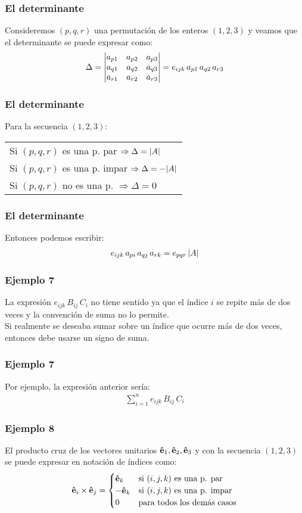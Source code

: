 \documentclass[12pt]{beamer}
\begin{document}
\begin{frame}
\frametitle{El determinante}
Consideremos $(p, q, r)$ una permutación de los enteros $(1, 2, 3)$ y veamos que el determinante se puede expresar como:
\begin{align*}
\Delta = \mqty|
a_{p1} & a_{p2} & a_{p3} \\
a_{q1} & a_{q2} & a_{q3} \\
a_{r1} & a_{r2} & a_{r3}
| = e_{ijk} \, a_{p1} \, a_{q2} \, a_{r3}
\end{align*}
\end{frame}
\begin{frame}
\frametitle{El determinante}
Para la secuencia $(1, 2, 3)$:
\fontsize{12}{12}\selectfont
\begin{table}[H]
\large
\centering
\begin{tabular}{l}
Si $(p, q, r)$ es una p. par $\Rightarrow \Delta = \abs{A}$ \\
Si $(p, q, r)$ es una p. impar $\Rightarrow \Delta = -\abs{A}$ \\
Si $(p, q, r)$ no es una p. $\Rightarrow \Delta = 0$    
\end{tabular}
\end{table}
\end{frame}
\begin{frame}
\frametitle{El determinante}
Entonces podemos escribir:
\begin{align*}
e_{ijk} \, a_{pi} \, a_{qj} \, a_{rk} = e_{pqr} \, \abs{A}
\end{align*}
\end{frame}
\begin{frame}
\frametitle{Ejemplo 7}
La expresión $e_{ijk} \, B_{ij} \, C_{i}$ no tiene sentido ya que el índice $i$ se repite más de dos veces y la convención de suma no lo permite.
\\
\bigskip
\pause
Si realmente se deseaba sumar sobre un índice que ocurre más de dos veces, entonces debe usarse un signo de suma.
\end{frame}
\begin{frame}
\frametitle{Ejemplo 7}
Por ejemplo, la expresión anterior sería:
\begin{align*}
\sum_{i=1}^{n} e_{ijk} \, B_{ij} \, C_{i}
\end{align*}
\end{frame}
\begin{frame}
\frametitle{Ejemplo 8}
El producto cruz de los vectores unitarios $\vu{e}_{1}, \vu{e}_{2}, \vu{e}_{3}$ y con la secuencia $(1, 2, 3)$ se puede expresar en notación de índices como: 
\begin{align*}
\vu{e}_{i} \times \vu{e}_{j} = \begin{cases}
\vu{e}_{k} & \mbox{si } (i, j, k) \mbox{ es una p. par} \\
-\vu{e}_{k} & \mbox{si } (i, j, k) \mbox{ es una p. impar} \\
0 & \mbox{para todos los demás casos}
\end{cases}
\end{align*}
\end{frame}
\end{document}
